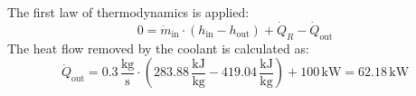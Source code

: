 The first law of thermodynamics is applied:  
\[
0 = \dot{m}_{\text{in}} \cdot (h_{\text{in}} - h_{\text{out}}) + \dot{Q}_R - \dot{Q}_{\text{out}}
\]  
The heat flow removed by the coolant is calculated as:  
\[
\dot{Q}_{\text{out}} = 0.3 \, \frac{\text{kg}}{\text{s}} \cdot \left( 283.88 \, \frac{\text{kJ}}{\text{kg}} - 419.04 \, \frac{\text{kJ}}{\text{kg}} \right) + 100 \, \text{kW} = 62.18 \, \text{kW}
\]